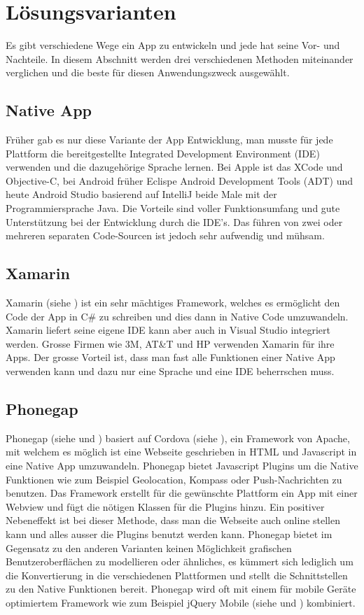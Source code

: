 \section{Lösungsvarianten}\label{loesungsvarianten}
Es gibt verschiedene Wege ein App zu entwickeln und jede hat seine Vor- und Nachteile. In diesem Abschnitt werden drei verschiedenen Methoden miteinander verglichen und die beste für diesen Anwendungszweck ausgewählt.

\subsection{Native App}\label{architektur_native}
Früher gab es nur diese Variante der App Entwicklung, man musste für jede Plattform die bereitgestellte Integrated Development Environment (IDE) verwenden und die dazugehörige Sprache lernen. Bei Apple ist das XCode und Objective-C, bei Android früher Eclispe Android Development Tools (ADT) und heute Android Studio basierend auf IntelliJ beide Male mit der Programmiersprache Java. Die Vorteile sind voller Funktionsumfang und gute Unterstützung bei der Entwicklung durch die IDE's. Das führen von zwei oder mehreren separaten Code-Sourcen ist jedoch sehr aufwendig und mühsam.

\subsection{Xamarin}\label{architektur_xamarin}
Xamarin (siehe \cite{xamarin}) ist ein sehr mächtiges Framework, welches es ermöglicht den Code der App in C\# zu schreiben und dies dann in Native Code umzuwandeln. Xamarin liefert seine eigene IDE kann aber auch in Visual Studio integriert werden. Grosse Firmen wie 3M, AT\&T und HP verwenden Xamarin für ihre Apps. Der grosse Vorteil ist, dass man fast alle Funktionen einer Native App verwenden kann und dazu nur eine Sprache und eine IDE beherrschen muss. 

\subsection{Phonegap}\label{architektur_phonegapt}
Phonegap (siehe \cite{phonegap} und \cite{wargo2012phonegap}) basiert auf Cordova (siehe \cite{cordova}), ein Framework von Apache, mit welchem es möglich ist eine Webseite geschrieben in HTML und Javascript in eine Native App umzuwandeln. Phonegap bietet Javascript Plugins um die Native Funktionen wie zum Beispiel Geolocation, Kompass oder Push-Nachrichten zu benutzen. Das Framework erstellt für die gewünschte Plattform ein App mit einer Webview und fügt die nötigen Klassen für die Plugins hinzu. Ein positiver Nebeneffekt ist bei dieser Methode, dass man die Webseite auch online stellen kann und alles ausser die Plugins benutzt werden kann. Phonegap bietet im Gegensatz zu den anderen Varianten keinen Möglichkeit grafischen Benutzeroberflächen zu modellieren oder ähnliches, es kümmert sich lediglich um die Konvertierung in die verschiedenen Plattformen und stellt die Schnittstellen zu den Native Funktionen bereit. Phonegap wird oft mit einem für mobile Geräte optimiertem Framework wie zum Beispiel jQuery Mobile (siehe \cite{jquery_mobile} und \cite{reid2011jquery}) kombiniert.


